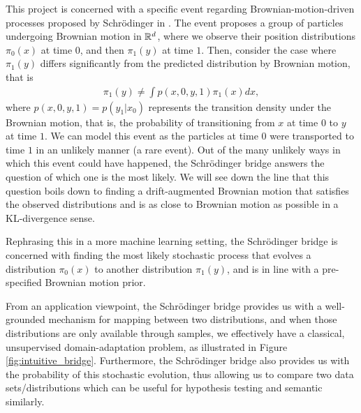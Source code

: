 \documentclass[a4paper,12pt,twoside,openright]{report}
\theoremstyle{definition}
\begin{document}
 This project is concerned with a specific event regarding Brownian-motion-driven processes proposed by Schrödinger in \citep{schrodinger1931uber, schrodinger1932theorie} . The event proposes a group of particles undergoing Brownian motion in ${\mathbb{R}}^d$, where we observe their position distributions $\pi_0(x)$ at time $0$, and then $\pi_1(y)$ at time $1$. Then, consider the case where $\pi_1(y)$ differs significantly from the predicted distribution by Brownian motion, that is
 \begin{align*}
     \pi_1(y) \neq \int p(x, 0, y , 1) \pi_1(x) dx,
 \end{align*}
 where $p(x, 0, y , 1) = p(y_1| x_0)$ represents the transition density under the Brownian motion, that is, the probability of transitioning from $x$ at time $0$ to $y$ at time $1$. We can model this event as the particles at time $0$ were transported to time $1$ in an unlikely manner (a rare event). Out of the many unlikely ways in which this event could have happened, the Schrödinger bridge answers the question of which one is the most likely. We will see down the line that this question boils down to finding a drift-augmented Brownian motion that satisfies the observed distributions and is as close to Brownian motion as possible in a KL-divergence sense.
 
 Rephrasing this in a more machine learning setting, the Schrödinger bridge is concerned with finding the most likely stochastic process that evolves a distribution $\pi_0(x)$ to another distribution $\pi_1(y)$, and is in line with a pre-specified Brownian motion prior.
 
 From an application viewpoint, the Schrödinger bridge provides us with a well-grounded mechanism for mapping between two distributions, and when those distributions are only available through samples, we effectively have a classical, unsupervised domain-adaptation problem, as illustrated in Figure \ref{fig:intuitive_bridge}. Furthermore, the Schrödinger bridge also provides us with the probability of this stochastic evolution, thus allowing us to compare two data sets/distributions which can be useful for hypothesis testing and semantic similarly.
 
\end{document}
